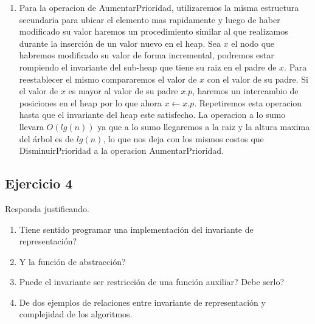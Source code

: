 \documentclass[10pt, a4paper]{report}
\begin{document}
\begin{enumerate}
 \item Para la operacion de AumentarPrioridad, utilizaremos la misma estructura secundaria para ubicar el elemento mas rapidamente y luego de haber modificado su valor haremos un procedimiento similar al que realizamos durante la inserci\'on de un valor nuevo en el heap. Sea $x$ el nodo que habremos modificado su valor de forma incremental, podremos estar rompiendo el invariante del sub-heap que tiene su raiz en el padre de $x$. Para reestablecer el mismo compararemos el valor de $x$ con el valor de su padre. Si el valor de $x$ es mayor al valor de su padre $x.p$, haremos un intercambio de posiciones en el heap por lo que ahora $x \gets x.p$. Repetiremos esta operacion hasta que el invariante del heap este satisfecho. La operacion a lo sumo llevara $O(lg(n))$ ya que a lo sumo llegaremos a la raiz y la altura maxima del \'arbol es de $lg(n)$, lo que nos deja con los mismos costos que DisminuirPrioridad a la operacion AumentarPrioridad.
\end{enumerate}

\subsection*{Ejercicio 4}

Responda justificando.
\begin{enumerate}
 \item Tiene sentido programar una implementaci\'on del invariante de representaci\'on?
 \item Y la funci\'on de abstracci\'on?
 \item Puede el invariante ser restricci\'on de una funci\'on auxiliar? Debe serlo?
 \item De dos ejemplos de relaciones entre invariante de representaci\'on y complejidad de los algoritmos.
\end{enumerate}
\end{document}
